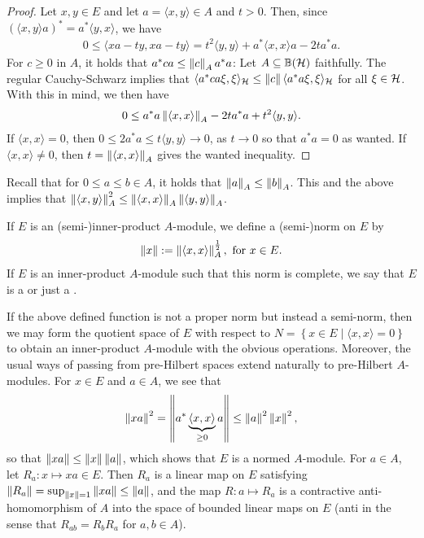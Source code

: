 \begin{proof}
Let $x,y \in E$ and let $a = \langle x,y \rangle \in A$ and $t >0$. Then, since $(\langle x,y \rangle a)^* = a^*\langle y,x\rangle$, we have
\begin{align*}
	0 \leq \langle xa-ty,xa-ty\rangle =t^2\langle y,y \rangle + a^* \langle x,x \rangle a-2ta^*a.
\end{align*}
For $c \geq 0 $ in $A$, it holds that $a^*c a \leq \left\lVert c \right\rVert_A a^*a$: Let $A \subseteq \mathbb{B}(\mathcal{H})$ faithfully. The regular Cauchy-Schwarz implies that $\langle a^*ca \xi,\xi\rangle_{\mathcal{H}} \leq \left\lVert c \right\rVert \langle a^*a \xi,\xi\rangle_{\mathcal{H}}$ for all $ \xi \in \mathcal{H}$. With this in mind, we then have
\begin{align*}
	0 \leq  a^*a \left\lVert \langle x , x \rangle \right\rVert_A -2t a^*a + t^2 \langle y, y \rangle.
\end{align*}
If $\langle x , x \rangle = 0$, then $0 \leq 2a^*a \leq t \langle y , y\rangle \to 0$, as $t \to 0$ so that $a^*a = 0$ as wanted. If $\langle x , x \rangle \neq 0$, then $t = \left\lVert \langle x,x\rangle\right\rVert_A$ gives the wanted inequality.
\end{proof}
Recall that for $0 \leq a \leq b \in A$, it holds that $\left\lVert a \right\rVert_A \leq \left\lVert b \right\rVert_A$. This and the above implies that $\left\lVert \langle x,y \rangle\right\rVert_A^2 \leq \left\lVert \langle x, x \rangle \right\rVert_A \left\lVert \langle y,y\rangle \right\rVert_A$. 
\begin{definition}
	If $E$ is an (semi-)inner-product $A$-module, we define a (semi-)norm on $E$ by
	\begin{align*}
		\left\lVert x \right\rVert := \left\lVert \langle x , x \rangle\right\rVert_A^{\frac12}, \text{ for } x \in E.
	\end{align*}
	If $E$ is an inner-product $A$-module such that this norm is complete, we say that $E$ is a  or just a .
\end{definition}
If the above defined function is not a proper norm but instead a semi-norm, then we may form the quotient space of $E$ with respect to $N=\left\{ x \in E \mid \langle x , x \rangle = 0 \right\}$ to obtain an inner-product $A$-module with the obvious operations. Moreover, the usual ways of passing from pre-Hilbert spaces extend naturally to pre-Hilbert $A$-modules. For $x \in E$ and $a \in A$, we see that
\begin{align*}
	\left\lVert x a \right\rVert^2 = \left\lVert a^* \underbrace{\langle x, x \rangle}_{\geq 0} a \right\rVert \leq \left\lVert a \right\rVert^2 \left\lVert x \right\rVert^2,
\end{align*}
so that $\left\lVert x a \right\rVert \leq \left\lVert x \right\rVert \left\lVert a \right\rVert$, which shows that $E$ is a normed $A$-module. For $a \in A$, let $R_a \colon x \mapsto xa \in E$. Then $R_a$ is a linear map on $E$ satisfying $\left\lVert R_a\right\rVert = \sup_{\left\lVert x \right\rVert = 1} \left\lVert xa \right\rVert \leq \left\lVert a \right\rVert$, and the map $R \colon a \mapsto R_a$ is a contractive anti-homomorphism of $A$ into the space of bounded linear maps on $E$ (anti in the sense that $R_{ab}=R_bR_a$ for $a,b \in A$).




